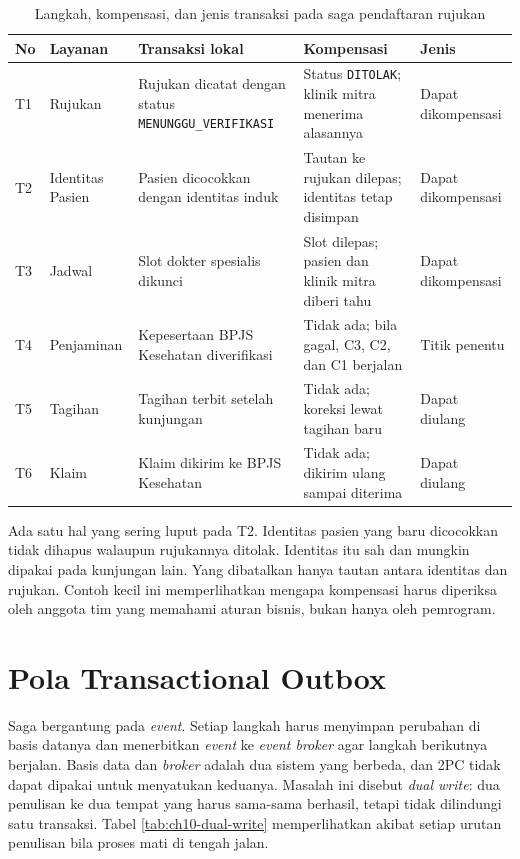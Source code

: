 \begin{table}[!htb]
  \centering
  \caption{Langkah, kompensasi, dan jenis transaksi pada saga pendaftaran rujukan}
  \label{tab:ch10-saga-kasus}
  \footnotesize
  \begin{tabularx}{\textwidth}{>{\raggedright\arraybackslash}p{0.6cm} >{\raggedright\arraybackslash}p{2.1cm} >{\raggedright\arraybackslash}X >{\raggedright\arraybackslash}X >{\raggedright\arraybackslash}p{2.0cm}}
    \hline
    \textbf{No} & \textbf{Layanan} & \textbf{Transaksi lokal} & \textbf{Kompensasi} &
      \textbf{Jenis} \\ \hline
    T1 & Rujukan & Rujukan dicatat dengan status \texttt{MENUNGGU\_VERIFIKASI} & Status
      \texttt{DITOLAK}; klinik mitra menerima alasannya & Dapat dikompensasi \\ \hline
    T2 & Identitas Pasien & Pasien dicocokkan dengan identitas induk & Tautan ke rujukan dilepas;
      identitas tetap disimpan & Dapat dikompensasi \\ \hline
    T3 & Jadwal & Slot dokter spesialis dikunci & Slot dilepas; pasien dan klinik mitra diberi
      tahu & Dapat dikompensasi \\ \hline
    T4 & Penjaminan & Kepesertaan BPJS Kesehatan diverifikasi & Tidak ada; bila gagal, C3, C2, dan
      C1 berjalan & Titik penentu \\ \hline
    T5 & Tagihan & Tagihan terbit setelah kunjungan & Tidak ada; koreksi lewat tagihan baru &
      Dapat diulang \\ \hline
    T6 & Klaim & Klaim dikirim ke BPJS Kesehatan & Tidak ada; dikirim ulang sampai diterima &
      Dapat diulang \\ \hline
  \end{tabularx}
\end{table}

Ada satu hal yang sering luput pada T2. Identitas pasien yang baru dicocokkan tidak dihapus walaupun
rujukannya ditolak. Identitas itu sah dan mungkin dipakai pada kunjungan lain. Yang dibatalkan hanya
tautan antara identitas dan rujukan. Contoh kecil ini memperlihatkan mengapa kompensasi harus
diperiksa oleh anggota tim yang memahami aturan bisnis, bukan hanya oleh pemrogram.

\section{Pola Transactional Outbox}
\label{sec:ch10-outbox}

Saga bergantung pada \textit{event}. Setiap langkah harus menyimpan perubahan di basis datanya dan
menerbitkan \textit{event} ke \textit{event broker} agar langkah berikutnya berjalan. Basis data dan
\textit{broker} adalah dua sistem yang berbeda, dan 2PC tidak dapat dipakai untuk menyatukan
keduanya. Masalah ini disebut \textit{dual write}: dua penulisan ke dua tempat yang harus sama-sama
berhasil, tetapi tidak dilindungi satu transaksi. Tabel \ref{tab:ch10-dual-write} memperlihatkan
akibat setiap urutan penulisan bila proses mati di tengah jalan.

